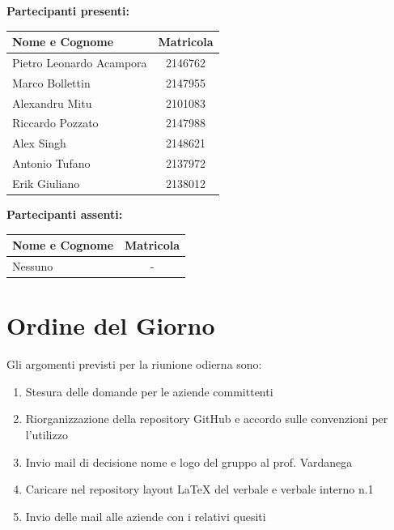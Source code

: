 \documentclass[a4paper, 11pt]{article}
\begin{document}
\vspace{0.5cm}
\textbf{Partecipanti presenti:} \\
\vspace{0.2cm}
\renewcommand{\arraystretch}{1.2}
\begin{tabularx}{0.8\textwidth}{|X|c|}
\hline
\textbf{Nome e Cognome} & \textbf{Matricola} \\ \hline
Pietro Leonardo Acampora & 2146762 \\ \hline
Marco Bollettin & 2147955 \\ \hline
Alexandru Mitu & 2101083 \\ \hline
Riccardo Pozzato & 2147988 \\ \hline
Alex Singh & 2148621 \\ \hline
Antonio Tufano & 2137972 \\ \hline
Erik Giuliano & 2138012 \\ \hline
\end{tabularx}

\vspace{0.5cm}
\textbf{Partecipanti assenti:} \\
\vspace{0.2cm}
\renewcommand{\arraystretch}{1.2}
\begin{tabularx}{0.8\textwidth}{|X|c|}
\hline
\textbf{Nome e Cognome} & \textbf{Matricola} \\ \hline
 Nessuno & - \\ \hline
\end{tabularx}

\vspace{0.5cm}
\section{Ordine del Giorno}
Gli argomenti previsti per la riunione odierna sono:
\begin{enumerate}
    \item Stesura delle domande per le aziende committenti
    \item Riorganizzazione della repository GitHub e accordo sulle convenzioni per l'utilizzo
    \item Invio mail di decisione nome e logo del gruppo al prof. Vardanega
    \item Caricare nel repository layout LaTeX del verbale e verbale interno n.1
    \item Invio delle mail alle aziende con i relativi quesiti
\end{enumerate}
\end{document}
